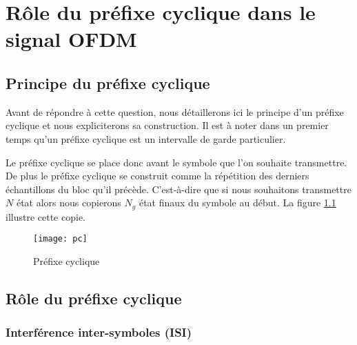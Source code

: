 \chapter{Rôle du préfixe cyclique dans le signal OFDM}

\section{Principe du préfixe cyclique}

Avant de répondre à cette question, nous détaillerons ici le principe d'un
préfixe cyclique et nous expliciterons sa construction. Il est à noter dans un
premier temps qu'un préfixe cyclique est un intervalle de garde
particulier. ~\\


Le préfixe cyclique se place donc avant le symbole que l'on souhaite
transmettre. De plus le préfixe cyclique se construit comme la répétition des
derniers échantillons du bloc qu'il précède. C'est-à-dire que si nous souhaitons
transmettre $N$ état alors nous copierons $N_g$ état finaux du
symbole au début. La figure \ref{fig:PC} illustre cette copie.

\begin{figure}[!h]
  \centering
  \texttt{[image: pc]}
  \caption{Préfixe cyclique}
  \label{fig:PC}
\end{figure}



\section{Rôle du préfixe cyclique}

\subsection{Interférence inter-symboles (ISI)}
\label{ISI}




